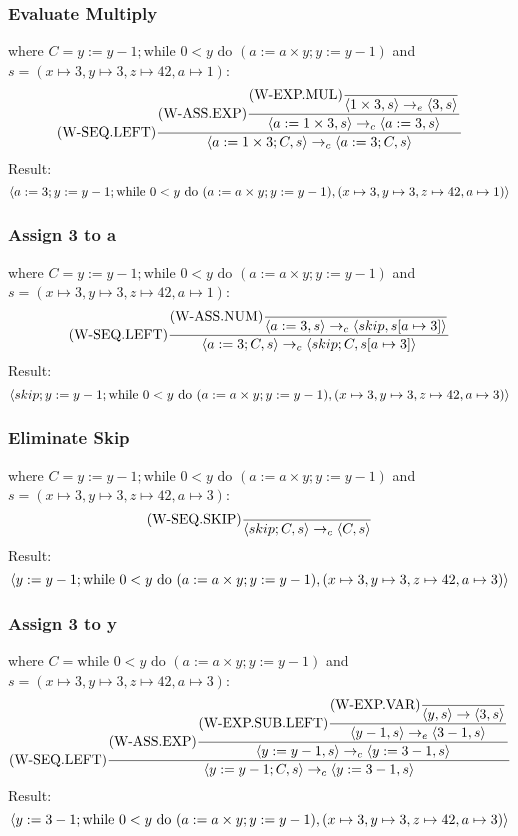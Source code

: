 \documentclass{report}
\begin{document}
\subsubsection*{Evaluate Multiply}
where $C = y:= y - 1;  \text{while } 0<y \text{ do } (a:= a \times y; y:= y - 1)$ and $s = (x \mapsto 3, y \mapsto 3, z \mapsto 42, a \mapsto 1)$:
\[\text{(W-SEQ.LEFT)}\dfrac{
		\text{(W-ASS.EXP)}\dfrac{
			\text{(W-EXP.MUL)}\dfrac{}{\langle 1 \times 3, s \rangle \to_e \langle 3, s \rangle}
		}{\langle a := 1 \times 3, s \rangle \to_c \langle a := 3, s \rangle}
	}{\langle a := 1 \times 3; C, s \rangle \to_c \langle a := 3; C, s \rangle}\]
Result:
\[\langle a := 3; y:= y - 1;  \text{while } 0<y \text{ do } (a:= a \times y; y:= y - 1), (x \mapsto 3, y \mapsto 3, z \mapsto 42, a \mapsto 1) \rangle\]
\subsubsection*{Assign 3 to a}
where $C = y:= y - 1;  \text{while } 0<y \text{ do } (a:= a \times y; y:= y - 1)$ and $s = (x \mapsto 3, y \mapsto 3, z \mapsto 42, a \mapsto 1)$:
\[\text{(W-SEQ.LEFT)}\dfrac{
		\text{(W-ASS.NUM)}\dfrac{}{\langle a := 3, s \rangle \to_c \langle skip, s[a \mapsto 3] \rangle}
	}{\langle a := 3; C, s \rangle \to_c \langle skip;C, s[a \mapsto 3] \rangle}\]
Result:
\[\langle skip; y:= y - 1;  \text{while } 0<y \text{ do } (a:= a \times y; y:= y - 1), (x \mapsto 3, y \mapsto 3, z \mapsto 42, a \mapsto 3) \rangle\]
\subsubsection*{Eliminate Skip}
where $C = y:= y - 1;  \text{while } 0<y \text{ do } (a:= a \times y; y:= y - 1)$ and $s = (x \mapsto 3, y \mapsto 3, z \mapsto 42, a \mapsto 3)$:
\[\text{(W-SEQ.SKIP)}\dfrac{}{\langle skip;C, s \rangle \to_c \langle C, s \rangle}\]
Result:
\[\langle y:= y - 1;  \text{while } 0<y \text{ do } (a:= a \times y; y:= y - 1), (x \mapsto 3, y \mapsto 3, z \mapsto 42, a \mapsto 3) \rangle\]
\subsubsection*{Assign 3 to y}
where $C = \text{while } 0<y \text{ do } (a:= a \times y; y:= y - 1)$ and $s = (x \mapsto 3, y \mapsto 3, z \mapsto 42, a \mapsto 3)$:
\[\text{(W-SEQ.LEFT)}\dfrac{
		\text{(W-ASS.EXP)}\dfrac{
			\text{(W-EXP.SUB.LEFT)}\dfrac{
				\text{(W-EXP.VAR)}\dfrac{}{\langle y, s \rangle \to \langle 3, s \rangle}
			}{\langle y - 1, s \rangle \to_e \langle 3 - 1, s \rangle}
		}{\langle y := y - 1, s \rangle \to_c \langle y := 3 - 1, s \rangle}
	}{\langle y := y - 1; C, s \rangle \to_c \langle y := 3 - 1, s \rangle}\]
Result:
\[\langle y:= 3 - 1;  \text{while } 0<y \text{ do } (a:= a \times y; y:= y - 1), (x \mapsto 3, y \mapsto 3, z \mapsto 42, a \mapsto 3) \rangle\]
\end{document}
